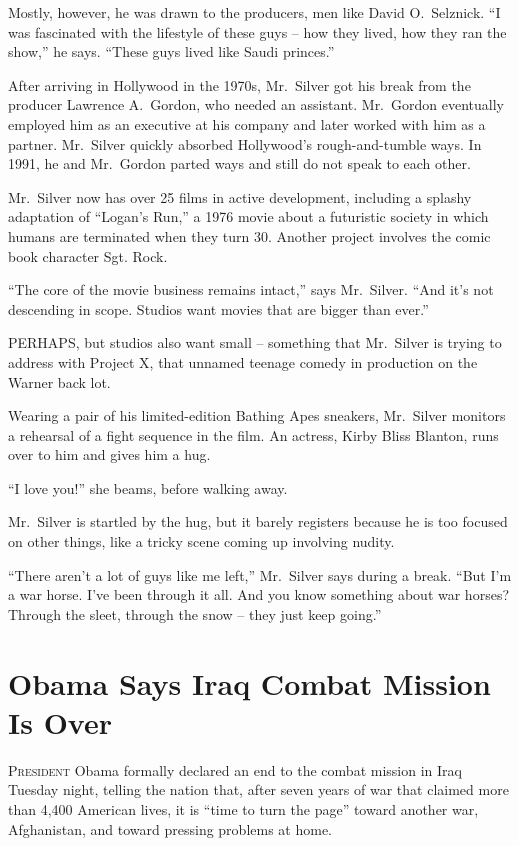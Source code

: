 ﻿\documentclass[12pt]{article}
\begin{document}
Mostly, however, he was drawn to the producers, men like David O.~Selznick. ``I was fascinated with
the lifestyle of these guys -- how they lived, how they ran the show,'' he says. ``These guys lived
like Saudi princes.''

After arriving in Hollywood in the 1970s, Mr.~Silver got his break from the producer Lawrence
A.~Gordon, who needed an assistant. Mr.~Gordon eventually employed him as an executive at his
company and later worked with him as a partner. Mr.~Silver quickly absorbed Hollywood's
rough-and-tumble ways. In 1991, he and Mr.~Gordon parted ways and still do not speak to each other.

Mr.~Silver now has over 25 films in active development, including a splashy adaptation of ``Logan's
Run,'' a 1976 movie about a futuristic society in which humans are terminated when they turn 30.
Another project involves the comic book character Sgt. Rock.

``The core of the movie business remains intact,'' says Mr.~Silver. ``And it's not descending in
scope. Studios want movies that are bigger than ever.''

PERHAPS, but studios also want small -- something that Mr.~Silver is trying to address with Project
X, that unnamed teenage comedy in production on the Warner back lot.

Wearing a pair of his limited-edition Bathing Apes sneakers, Mr.~Silver monitors a rehearsal of a
fight sequence in the film. An actress, Kirby Bliss Blanton, runs over to him and gives him a hug.

``I love you!'' she beams, before walking away.

Mr.~Silver is startled by the hug, but it barely registers because he is too focused on other
things, like a tricky scene coming up involving nudity.

``There aren't a lot of guys like me left,'' Mr.~Silver says during a break. ``But I'm a war horse.
I've been through it all. And you know something about war horses? Through the sleet, through the
snow -- they just keep going.''

\pagebreak
\section{Obama Says Iraq Combat Mission Is Over}

\lettrine{P}{resident} Obama formally declared an end to the combat mission
in Iraq Tuesday night, telling the nation that, after seven years of war that claimed more than
4,400 American lives, it is ``time to turn the page'' toward another war, Afghanistan, and toward
pressing problems at home.
\end{document}
